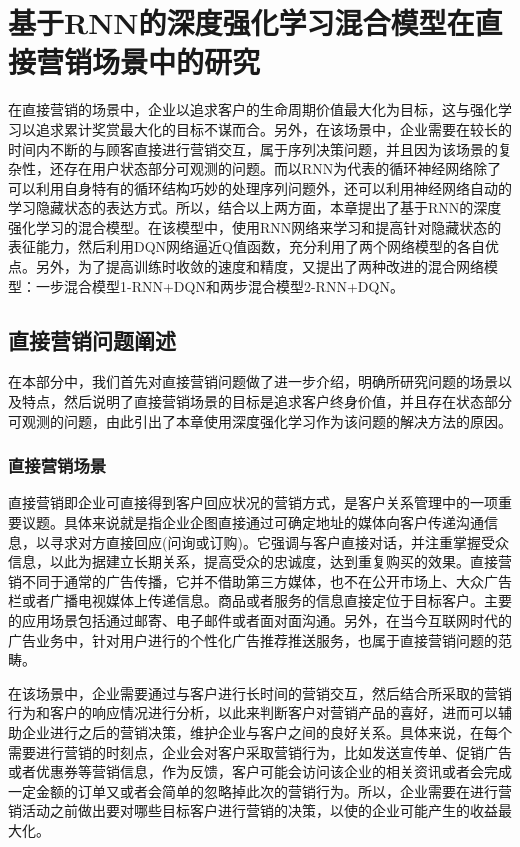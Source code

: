 \chapter{基于RNN的深度强化学习混合模型在直接营销场景中的研究}
在直接营销的场景中，企业以追求客户的生命周期价值最大化为目标，这与强化学习以追求累计奖赏最大化的目标不谋而合。另外，在该场景中，企业需要在较长的时间内不断的与顾客直接进行营销交互，属于序列决策问题，并且因为该场景的复杂性，还存在用户状态部分可观测的问题。而以RNN为代表的循环神经网络除了可以利用自身特有的循环结构巧妙的处理序列问题外，还可以利用神经网络自动的学习隐藏状态的表达方式。所以，结合以上两方面，本章提出了基于RNN的深度强化学习的混合模型。在该模型中，使用RNN网络来学习和提高针对隐藏状态的表征能力，然后利用DQN网络逼近Q值函数，充分利用了两个网络模型的各自优点。另外，为了提高训练时收敛的速度和精度，又提出了两种改进的混合网络模型：一步混合模型1-RNN+DQN和两步混合模型2-RNN+DQN。

\section{直接营销问题阐述}
在本部分中，我们首先对直接营销问题做了进一步介绍，明确所研究问题的场景以及特点，然后说明了直接营销场景的目标是追求客户终身价值，并且存在状态部分可观测的问题，由此引出了本章使用深度强化学习作为该问题的解决方法的原因。

\subsection{直接营销场景}
直接营销即企业可直接得到客户回应状况的营销方式，是客户关系管理中的一项重要议题。具体来说就是指企业企图直接通过可确定地址的媒体向客户传递沟通信息，以寻求对方直接回应(问询或订购)。它强调与客户直接对话，并注重掌握受众信息，以此为据建立长期关系，提高受众的忠诚度，达到重复购买的效果。直接营销不同于通常的广告传播，它并不借助第三方媒体，也不在公开市场上、大众广告栏或者广播电视媒体上传递信息。商品或者服务的信息直接定位于目标客户。主要的应用场景包括通过邮寄、电子邮件或者面对面沟通。另外，在当今互联网时代的广告业务中，针对用户进行的个性化广告推荐推送服务，也属于直接营销问题的范畴。

在该场景中，企业需要通过与客户进行长时间的营销交互，然后结合所采取的营销行为和客户的响应情况进行分析，以此来判断客户对营销产品的喜好，进而可以辅助企业进行之后的营销决策，维护企业与客户之间的良好关系。具体来说，在每个需要进行营销的时刻点，企业会对客户采取营销行为，比如发送宣传单、促销广告或者优惠券等营销信息，作为反馈，客户可能会访问该企业的相关资讯或者会完成一定金额的订单又或者会简单的忽略掉此次的营销行为。所以，企业需要在进行营销活动之前做出要对哪些目标客户进行营销的决策，以使的企业可能产生的收益最大化。

